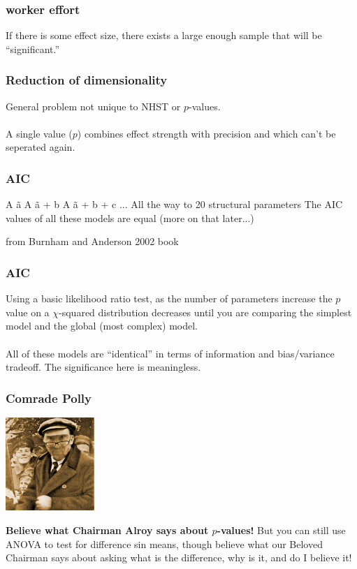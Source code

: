 \documentclass{beamer}
\begin{document}
  
  
  \begin{frame}
    \frametitle{worker effort}
    If there is some effect size, there exists a large enough sample that will be ``significant.''
  \end{frame}
  
  
  
  \begin{frame}
    \frametitle{Reduction of dimensionality}
    General problem not unique to NHST or \(p\)-values.
    \\~\\
    A single value (\(p\)) combines effect strength with precision and which can't be seperated again.
  \end{frame}



  \begin{frame}
    \frametitle{AIC}
    A \~ a
    A \~ a + b
    A \~ a + b + c
    ...
    All the way to 20 structural parameters
    The AIC values of all these models are equal (more on that later...)
    
    \footnotesize{from Burnham and Anderson 2002 book}
  \end{frame}
  
  
  
  \begin{frame}
    \frametitle{AIC}
    Using a basic likelihood ratio test, as the number of parameters increase the \(p\) value on a \(\chi\)-squared distribution decreases until you are comparing the simplest model and the global (most complex) model.
    \\~\\
    All of these models are ``identical'' in terms of information and bias/variance tradeoff. The significance here is meaningless.
  \end{frame}
  
  
  
  \begin{frame}
    \frametitle{Comrade Polly}
    
    \includegraphics[height = 100pt, keepaspectratio = true]{polly}
    
    \textbf{Believe what Chairman Alroy says about \(p\)-values!}
    But you can still use ANOVA to test for difference sin means, though believe what our Beloved Chairman says about asking what is the difference, why is it, and do I believe it!
  \end{frame}
  
\end{document}
